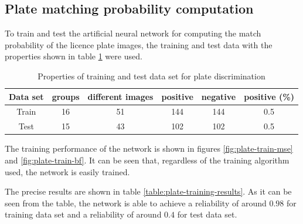\documentclass[times, utf8, zavrsni]{fer}
\begin{document}
\subsection{Plate matching probability computation}

To train and test the artificial neural network for computing the match
probability of the licence plate images, the training and test data with the
properties shown in table \ref{table:plate-data-properties} were used.

\begin{table}[h]
\begin{center} {\footnotesize
\begin{tabular}{c|c|c|c|c|c}
Data set & groups & different images & positive & negative & positive (\%) \\
\hline
Train & 16 & 51 & 144 & 144 & 0.5 \\
Test & 15 & 43 & 102 & 102 & 0.5 \\
\end{tabular} }
\end{center}
\caption{\footnotesize Properties of training and test data set for plate
discrimination}
\label{table:plate-data-properties}
\end{table}

The training performance of the network is shown in figures
\ref{fig:plate-train-mse} and \ref{fig:plate-train-bf}. It can be seen
that, regardless of the training algorithm used, the network is easily trained.

The precise results are shown in table \ref{table:plate-training-results}.
As it can be seen from the table, the network is able
to achieve a reliability of around $0.98$ for training data set and a
reliability of around $0.4$ for test data set.
\end{document}
